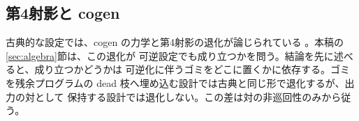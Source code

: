 \subsection{第4射影と cogen}
\label{sec:related-fourth}

古典的な設定では、cogen の力学と第4射影の退化が論じられている
\cite{Gluck2009,Gluck2012}。本稿の\ref{sec:algebra}節は、この退化が
可逆設定でも成り立つかを問う。結論を先に述べると、成り立つかどうかは
可逆化に伴うゴミをどこに置くかに依存する。ゴミを残余プログラムの
dead 枝へ埋め込む設計では古典と同じ形で退化するが、出力の対として
保持する設計では退化しない。この差は対の非巡回性のみから従う。

